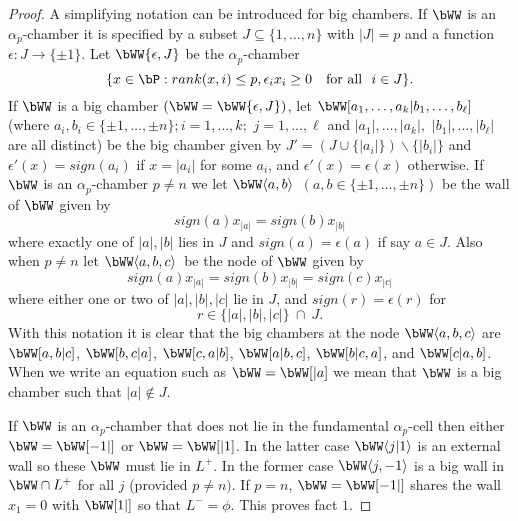 \documentclass{memo-l}
\theoremstyle{definition}
\theoremstyle{remark}
\numberwithin{section}{chapter}
\numberwithin{equation}{chapter}
\begin{document}
\begin{proof}
   A simplifying notation can be introduced for big chambers.  If 
$\bWW$ is an ${\alpha}_{p}$-chamber it is specified 
by a subset $J {\subseteq} \{1,\ldots ,n\}$ with $\vert J\vert = p$ 
and a function ${\epsilon}:J {\to} \{{\pm}1\}$.  Let 
$\bWW\{{\epsilon},J\}$ be the  ${\alpha}_{p}$-chamber
$$ 
\{ x  \in  \bP: rank(x,i)\le p, {\epsilon}_{i}x_{i} \ge 0 \quad
{\text{for all}}\ \  i  \in  J\}.
$$
If $\bWW$ is a big chamber $(\bWW = 
\bWW \{{\epsilon},J\})$,
let $\bWW[a_{1},\ldots ,a_{k}\vert b_{1},\ldots ,
b_{{\ell}}]$ (where 
\newline
$a_{i},b_{i}  \in  \{{\pm}1,\ldots ,{\pm}n\}; i = 1,\ldots ,k;$
$j  = 1,\ldots ,{\ell}$ and $\vert a_{1}\vert ,\ldots, \vert a_{k}\vert ,$ 
$\vert b_{1}\vert , \ldots ,\vert b_{{\ell}}\vert$ are all distinct) 
be the big chamber given by $J' =  (J \cup \{\vert a_{i}\vert \})\backslash 
\{\vert b_{i}\vert \}$ and ${\epsilon}'(x) = sign(a_{i})$ if
$x = \vert a_{i}\vert$ for some $a_{i}$, and ${\epsilon}'(x) = {\epsilon}(x)$
otherwise.  If $\bWW$ is an ${\alpha}_{p}$-chamber 
$p\ne n$ we let $\bWW\langle a,b\rangle $\ $(a, b  \in  \{{\pm}1,\ldots ,
{\pm}n\})$ be the wall of $\bWW$ given by
$$
sign(a)x_{|a|} = sign(b)x_{|b|}
$$
where exactly one of $\vert a\vert ,\vert b\vert$ lies in $J$ and
$sign(a) = {\epsilon}(a)$ if say $a  \in  J$.  Also when $p \ne n$ let 
$\bWW \langle a,b,c\rangle $\ be the node of 
$\bWW$ given by
$$
sign(a)x_{|a|} = sign(b)x_{|b|} = sign(c)x_{|c|}
$$
where either one or two of $\vert a\vert ,\vert b\vert ,\vert c\vert$ lie
in $J$, and $sign(r) = {\epsilon}(r)$ for 
$$r  \in  \{\vert a\vert ,\vert b\vert ,\vert c\vert \}\  \cap \ J.$$  
With this notation it is clear that the
big chambers at the node $\bWW\langle a,b,c\rangle
$ are 
$\bWW[a,b\vert c]$,
$\bWW[b,c\vert a]$, 
$\bWW[c,a\vert b]$, 
$\bWW[a\vert b,c]$, 
$\bWW[b\vert c,a]$, and 
$\bWW[c\vert a,b]$.  When we write an equation 
such as $\bWW = \bWW[\vert a]$
we mean that $\bWW$ is a big chamber such that 
$\vert a\vert {\notin} J$.

If $\bWW$ is an ${\alpha}_{p}$-chamber that does not lie 
in the fundamental $\alpha_p$-cell then either $\bWW = 
\bWW[-1\vert ]$ or $\bWW
= \bWW[\vert 1]$.  In the latter case 
$\bWW\langle j\vert 1\rangle $ is an
external wall so these $\bWW$ must lie in $L^{+}$.  In the 
former case
$\bWW\langle j,-1\rangle $ is a big wall in 
$\bWW \cap L^{+}$ for all $j$
(provided $p \ne n)$.  If $p = n$, $\bWW= 
\bWW[-1\vert ]$ shares
the wall $x_{1} = 0$ with $\bWW[1\vert ]$ so that 
$L^{-} = {\phi}$.  This	proves fact $1$.


\end{proof}
\end{document}

